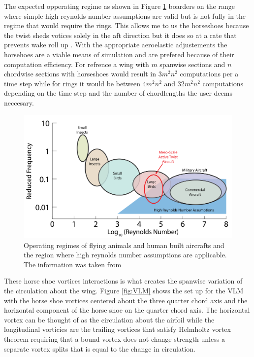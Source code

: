 \documentclass[11pt]{ucthesis}
\begin{document}
The expected opperating regime as shown in Figure \ref{fig:reynolds} boarders on the range where simple high reynolds number assumptions are valid but is not fully in the regime that would require the rings. This allows me to us the horseshoes because the twist sheds votices solely in the aft direction but it does so at a rate that prevents wake roll up \cite{koochesfahani1989vortical}. With the appropriate aeroelastic adjustements the horsehoes are a viable means of simulation and are prefered because of their computation efficiency. For refrence a wing with $m$ spanwise sections and $n$ chordwise sections with horseshoes would result in $3m^2n^2$ computations per a time step while for rings it would be between $4m^2n^2$ and $32m^2n^2$ computations depending on the time step and the number of chordlengths the user deems neccesary. 

\begin{figure}[thpb]
\centering
\includegraphics[width=1\linewidth]{Figures/ReducedFrequencyvReynoldsTypes-01.png}
\caption{Operating regimes of flying animals and human built aircrafts and the region where high reynolds number assumptions are applicable. The information was taken from \cite{mueller2001fixed}}
\label{fig:reynolds}
\end{figure}

These horse shoe vortices interactions is what creates the spanwise variation of the circulation about the wing. Figure \ref{fig:VLM} shows the set up for the VLM with the horse shoe vortices centered about the three quarter chord axis and the horizontal component of the horse shoe on the quarter chord axis. The horizontal vortex can be thought of as the circulation about the airfoil while the longitudinal vorticies are the trailing vortices that satisfy Helmholtz vortex theorem requiring that a bound-vortex does not change strength unless a separate vortex splits that is equal to the change in circulation. 
\end{document}
